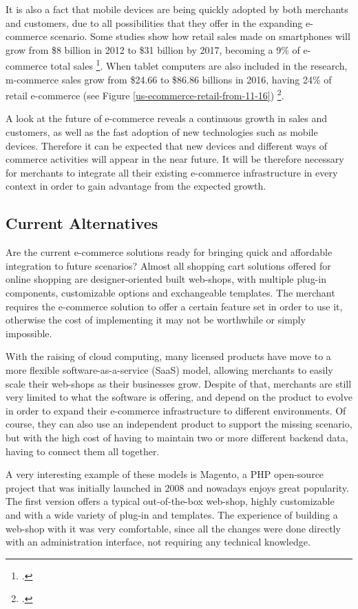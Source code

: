 It is also a fact that mobile devices are being quickly adopted by both merchants and customers, due to all possibilities that they offer in the expanding e-commerce scenario. Some studies show how retail sales made on smartphones will grow from \$8 billion in 2012 to \$31 billion by 2017, becoming a 9\% of e-commerce total sales \footcite{MERJ13}. When tablet computers are also included in the research, m-commerce sales grow from \$24.66 to \$86.86 billions in 2016, having 24\% of retail e-commerce (see Figure \ref{us-ecommerce-retail-from-11-16}) \footcite{eMa113}.

A look at the future of e-commerce reveals a continuous growth in sales and customers, as well as the fast adoption of new technologies such as mobile devices. Therefore it can be expected that new devices and different ways of commerce activities will appear in the near future. It will be therefore necessary for merchants to integrate all their existing e-commerce infrastructure in every context in order to gain advantage from the expected growth.

  
\subsection{Current Alternatives}

Are the current e-commerce solutions ready for bringing quick and affordable integration to future scenarios? Almost all shopping cart solutions offered for online shopping are designer-oriented built web-shops, with multiple plug-in components, customizable options and exchangeable templates. The merchant requires the e-commerce solution to offer a certain feature set in order to use it, otherwise the cost of implementing it may not be worthwhile or simply impossible.

With the raising of cloud computing, many licensed products have move to a more flexible software-as-a-service (SaaS) model, allowing merchants to easily scale their web-shops as their businesses grow. Despite of that, merchants are still very limited to what the software is offering, and depend on the product to evolve in order to expand their e-commerce infrastructure to different environments. Of course, they can also use an independent product to support the missing scenario, but with the high cost of having to maintain two or more different backend data, having to connect them all together.

A very interesting example of these models is Magento, a PHP open-source project that was initially launched in 2008 and nowadays enjoys great popularity. The first version offers a typical out-of-the-box web-shop, highly customizable and with a wide variety of plug-in and templates. The experience of building a web-shop with it was very comfortable, since all the changes were done directly with an administration interface, not requiring any technical knowledge.

